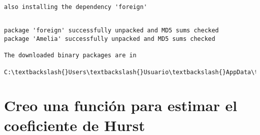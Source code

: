 \documentclass[11pt]{article}
\begin{document}
    \begin{Verbatim}[commandchars=\\\{\}]
also installing the dependency 'foreign'


    \end{Verbatim}

    \begin{Verbatim}[commandchars=\\\{\}]
package 'foreign' successfully unpacked and MD5 sums checked
package 'Amelia' successfully unpacked and MD5 sums checked

The downloaded binary packages are in
	C:\textbackslash{}Users\textbackslash{}Usuario\textbackslash{}AppData\textbackslash{}Local\textbackslash{}Temp\textbackslash{}RtmpemIx87\textbackslash{}downloaded\_packages

    \end{Verbatim}

    \hypertarget{creo-una-funciuxf3n-para-estimar-el-coeficiente-de-hurst}{%
\section{Creo una función para estimar el coeficiente de
Hurst}\label{creo-una-funciuxf3n-para-estimar-el-coeficiente-de-hurst}}
\end{document}
